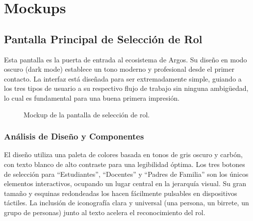 \section{Mockups}

\subsection{ Pantalla Principal de Selección de Rol}
\begin{samepage}\small
Esta pantalla es la puerta de entrada al ecosistema de Argos. Su diseño en modo oscuro (dark mode) establece un tono moderno y profesional desde el primer contacto. La interfaz está diseñada para ser extremadamente simple, guiando a los tres tipos de usuario a su respectivo flujo de trabajo sin ninguna ambigüedad, lo cual es fundamental para una buena primera impresión.
\begin{figure}[H]
	\centering
	\caption{Mockup de la pantalla de selección de rol.}\label{fig:mk-main}
\end{figure}
	\subsubsection*{Análisis de Diseño y Componentes}
	El diseño utiliza una paleta de colores basada en tonos de gris oscuro y carbón, con texto blanco de alto contraste para una legibilidad óptima. Los tres botones de selección para ``Estudiantes'', ``Docentes'' y ``Padres de Familia'' son los únicos elementos interactivos, ocupando un lugar central en la jerarquía visual. Su gran tamaño y esquinas redondeadas los hacen fácilmente pulsables en dispositivos táctiles. La inclusión de iconografía clara y universal (una persona, un birrete, un grupo de personas) junto al texto acelera el reconocimiento del rol.
    

\end{samepage}
